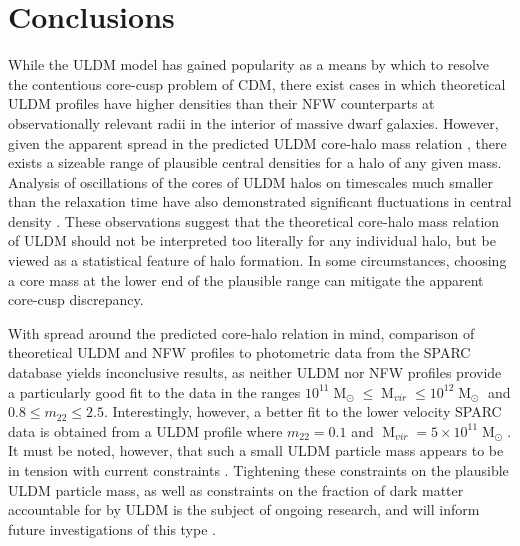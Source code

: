 \documentclass[a4paper,11pt]{article}
\begin{document}
\section{Conclusions}\label{sec:conclusion}

While the ULDM model has gained popularity as a means by which to resolve the contentious core-cusp problem of CDM, there exist cases in which theoretical ULDM profiles have higher densities than their NFW counterparts at observationally relevant radii in the interior of massive dwarf galaxies. However, given the apparent spread in the predicted ULDM core-halo mass relation \cite{Schive:2014hza}, there exists a sizeable range of plausible central densities for a halo of any given mass. Analysis of oscillations of the cores of ULDM halos on timescales much smaller than the relaxation time have also demonstrated significant fluctuations in central density \cite{Veltmaat:2018dfz}. These observations suggest that the theoretical core-halo mass relation of ULDM should not be interpreted too literally for any individual halo, but be viewed as a statistical feature of halo formation. In some circumstances, choosing a core mass at the lower end of the plausible range can mitigate the apparent core-cusp discrepancy. 

With spread around the predicted core-halo relation in mind, comparison of theoretical ULDM and NFW profiles to photometric data from the SPARC database yields inconclusive results, as neither ULDM nor NFW profiles provide a particularly good fit to the data in the ranges $10^{11}\operatorname{M}_{\odot}\leq \operatorname{M}_{vir} \leq 10^{12}\operatorname{M}_{\odot}$ and $0.8 \leq m_{22} \leq 2.5$. Interestingly, however, a better fit to the lower velocity SPARC data is obtained from a ULDM profile where $m_{22} = 0.1$ and $\operatorname{M}_{vir} = 5\times 10^{11}\operatorname{M}_{\odot}$. It must be noted, however, that such a small ULDM particle mass appears to be in tension with current constraints \cite{Amendola:2005ad, Bozek:2014uqa, Armengaud:2017nkf, Ni:2019qfa, Nebrin:2018vqt}. Tightening these constraints on the plausible ULDM particle mass, as well as constraints on the fraction of dark matter accountable for by ULDM is the subject of ongoing research, and will inform future investigations of this type \cite{Castellano:2019hdd, Lidz:2018fqo, Davoudiasl:2019nlo}.
\end{document}
